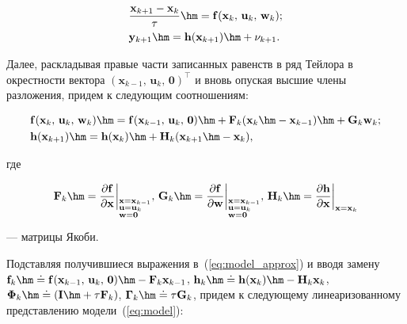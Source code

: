 \documentclass[
  AUTHOR={Симаков, В.А.},
  TITLE={Управление ориентацией беспилотных систем},
  SUBJECT={Проблемы навигации летательных аппаратов},
  SOURCE={./\jobname.zip},
  12pt,oneside]{commart}
\begin{document}
\begin{equation}
\label{eq:model_approx}
\begin{aligned}
&\frac{\mathbf{x}_{k+1}-\mathbf{x}_k}{\tau}\hm=\mathbf{f}(\mathbf{x}_k,\,\mathbf{u}_k,\,\mathbf{w}_k);\\
&\mathbf{y}_{k+1}\hm=\mathbf{h}(\mathbf{x}_{k+1})\hm+\mathbf{\nu}_{k+1}.
\end{aligned}
\end{equation}

Далее, раскладывая правые части записанных равенств в ряд Тейлора в окрестности вектора $(\mathbf{x}_{k-1},\,\mathbf{u}_k,\,\mathbf{0})^{\intercal}$ и вновь опуская высшие члены разложения, придем к следующим соотношениям:

\begin{equation}
\nonumber
\begin{aligned}
&\mathbf{f}(\mathbf{x}_k,\,\mathbf{u}_k,\,\mathbf{w}_k)\hm=\mathbf{f}(\mathbf{x}_{k-1},\,\mathbf{u}_k,\,\mathbf{0})\hm+\mathbf{F}_k(\mathbf{x}_k\hm-\mathbf{x}_{k-1})\hm+\mathbf{G}_k\mathbf{w}_k;\\
&\mathbf{h}(\mathbf{x}_{k+1})\hm=\mathbf{h}(\mathbf{x}_k)\hm+\mathbf{H}_k(\mathbf{x}_{k+1}\hm-\mathbf{x}_k),
\end{aligned}
\end{equation}

\noindent где

\begin{equation}
\nonumber
\mathbf{F}_k\hm=\frac{\partial\mathbf{f}}{\partial\mathbf{x}}\biggr\rvert_{\begin{subarray}{l}\mathbf{x}=\mathbf{x}_{k-1}\\\mathbf{u}=\mathbf{u}_k\\\mathbf{w}=\mathbf{0}\end{subarray}},\,\mathbf{G}_k\hm=\frac{\partial\mathbf{f}}{\partial\mathbf{w}}\biggr\rvert_{\begin{subarray}{l}\mathbf{x}=\mathbf{x}_{k-1}\\\mathbf{u}=\mathbf{u}_k\\\mathbf{w}=\mathbf{0}\end{subarray}},\,\mathbf{H}_k\hm=\frac{\partial\mathbf{h}}{\partial\mathbf{x}}\biggr\rvert_{\mathbf{x}=\mathbf{x}_k}
\end{equation}

\noindent--- матрицы Якоби.

Подставляя получившиеся выражения в~(\ref{eq:model_approx}) и вводя замену $\mathbf{f}_k\hm\doteq\mathbf{f}(\mathbf{x}_{k-1},\,\mathbf{u}_k,\,\mathbf{0})\hm-\mathbf{F}_k\mathbf{x}_{k-1}$, $\mathbf{h}_k\hm\doteq\mathbf{h}(\mathbf{x}_k)\hm-\mathbf{H}_k\mathbf{x}_k$, $\mathbf{\Phi}_k\hm\doteq(\mathbf{I}\hm+\tau\mathbf{F}_k)$, $\mathbf{\Gamma}_k\hm\doteq\tau\mathbf{G}_k$, придем к следующему линеаризованному представлению модели~(\ref{eq:model}):
\end{document}
